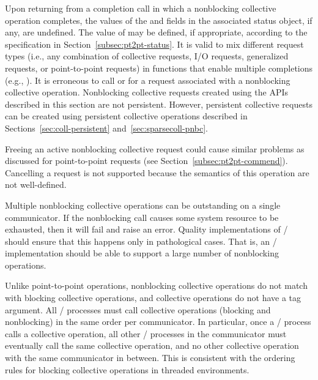 Upon returning from a completion call in which a nonblocking collective
operation completes, the values of
the  and  fields in the associated status object, if any, are undefined. The
value of  may be defined, if appropriate, according to
the specification in Section~\ref{subsec:pt2pt-status}.
It is valid to mix different request types (i.e., any combination of
collective requests, I/O requests, generalized  requests, or
point-to-point requests) in functions that enable multiple completions
(e.g., ).
%
It is erroneous to call
 or  for a request
associated with a nonblocking collective operation\label{pageref:mpi-request-free-nbc}.
%
Nonblocking collective requests created using the APIs described in this section are not persistent. However, persistent collective requests can be created using persistent collective operations described in Sections~\ref{sec:coll-persistent} and~\ref{sec:sparsecoll-pnbc}.

\begin{rationale}
Freeing an active nonblocking collective request could cause similar
problems as discussed for point-to-point requests (see Section~\ref{subsec:pt2pt-commend}).
Cancelling a request is not supported because the semantics of this
operation are not well-defined.
\end{rationale}


Multiple nonblocking collective
operations can be outstanding on a single communicator.
If the nonblocking call causes some system resource to be exhausted,
then it will fail and raise an error. Quality implementations
of \MPI/ should ensure that this happens only in pathological cases.
That is, an \MPI/ implementation should be able to support a large number
of  nonblocking operations.

Unlike point-to-point operations, nonblocking collective operations do
not match with blocking collective operations, and collective operations
do not have a tag argument. All \MPI/ processes must call collective
operations (blocking and nonblocking) in the same order per
communicator. In particular, once a \MPI/ process calls a collective
operation, all other \MPI/ processes in the communicator must eventually
call the same collective operation, and no other collective operation
with the same communicator
in between. This is consistent with the ordering rules for blocking
collective operations in threaded environments.

